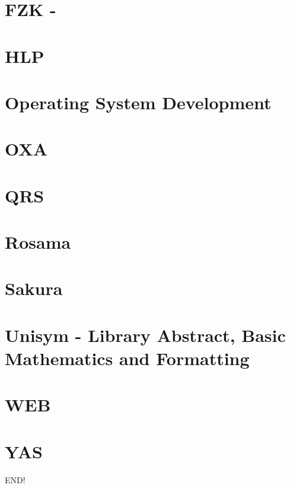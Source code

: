 \documentclass[a4paper,12pt,UTF8]{book}
\begin{document}
\chapter{FZK \mbox{-} }


\chapter{HLP}


\chapter{Operating System Development}


\chapter{OXA}


\chapter{QRS}


\chapter{Rosama}


\chapter{Sakura}


\chapter{Unisym \mbox{-} Library Abstract, Basic Mathematics and Formatting}


\chapter{WEB}


\chapter{YAS}


\newpage
END!%
\end{document}
